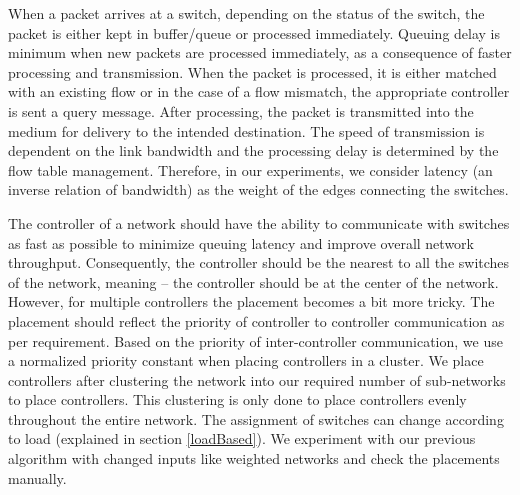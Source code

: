 \documentclass{article}
\begin{document}
	When a packet arrives at a switch, depending on the status of the switch, the packet is either kept in buffer/queue or processed immediately. Queuing delay is minimum when new packets are processed immediately, as a consequence of faster processing and transmission. When the packet is processed, it is either matched with an existing flow or in the case of a flow mismatch, the appropriate controller is sent a query message. After processing, the packet is transmitted into the medium for delivery to the intended destination. The speed of transmission is dependent on the link bandwidth and the processing delay is determined by the flow table management. Therefore, in our experiments, we consider latency (an inverse relation of bandwidth) as the weight of the edges connecting the switches.
	
	The controller of a network should have the ability to communicate with switches as fast as possible to minimize queuing latency and improve overall network throughput. Consequently, the controller should be the nearest to all the switches of the network, meaning -- the controller should be at the center of the network. However, for multiple controllers the placement becomes a bit more tricky. The placement should reflect the priority of controller to controller communication as per requirement. Based on the priority of inter-controller communication, we use a normalized priority constant when placing controllers in a cluster. We place controllers after clustering the network into our required number of sub-networks to place controllers. This clustering is only done to place controllers evenly throughout the entire network. The assignment of switches can change according to load (explained in section \ref{loadBased}). We experiment with our previous algorithm with changed inputs like weighted networks and check the placements manually.
	
\end{document}
